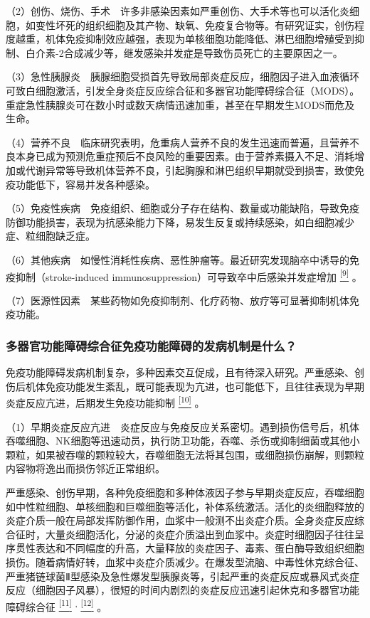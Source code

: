 （2）创伤、烧伤、手术　许多非感染因素如严重创伤、大手术等也可以活化炎细胞，如变性坏死的组织细胞及其产物、缺氧、免疫复合物等。有研究证实，创伤程度越重，机体免疫抑制效应越强，表现为单核细胞功能降低、淋巴细胞增殖受到抑制、白介素-2合成减少等，继发感染并发症是导致伤员死亡的主要原因之一。

（3）急性胰腺炎　胰腺细胞受损首先导致局部炎症反应，细胞因子进入血液循环可致白细胞激活，引发全身炎症反应综合征和多器官功能障碍综合征（MODS）。重症急性胰腺炎可在数小时或数天病情迅速加重，甚至在早期发生MODS而危及生命。

（4）营养不良　临床研究表明，危重病人营养不良的发生迅速而普遍，且营养不良本身已成为预测危重症预后不良风险的重要因素。由于营养素摄入不足、消耗增加或代谢异常等导致机体营养不良，引起胸腺和淋巴组织早期就受到损害，致使免疫功能低下，容易并发各种感染。

（5）免疫性疾病　免疫组织、细胞或分子存在结构、数量或功能缺陷，导致免疫防御功能损害，表现为抗感染能力下降，易发生反复或持续感染，如白细胞减少症、粒细胞缺乏症。

（6）其他疾病　如慢性消耗性疾病、恶性肿瘤等。最近研究发现脑卒中诱导的免疫抑制（stroke-induced
immunosuppression）可导致卒中后感染并发症增加
\protect\hyperlink{text00007.htmlux5cux23ch9-6}{\textsuperscript{{[}9{]}}}
。

（7）医源性因素　某些药物如免疫抑制剂、化疗药物、放疗等可显著抑制机体免疫功能。

\subsubsection{多器官功能障碍综合征免疫功能障碍的发病机制是什么？}

免疫功能障碍发病机制复杂，多种因素交互促成，且有待深入研究。严重感染、创伤后机体免疫功能发生紊乱，既可能表现为亢进，也可能低下，且往往表现为早期炎症反应亢进，后期发生免疫功能抑制
\protect\hyperlink{text00007.htmlux5cux23ch10-6}{\textsuperscript{{[}10{]}}}
。

（1）早期炎症反应亢进　炎症反应与免疫反应关系密切。遇到损伤信号后，机体吞噬细胞、NK细胞等迅速动员，执行防卫功能，吞噬、杀伤或抑制细菌或其他小颗粒，如果被吞噬的颗粒较大，吞噬细胞无法将其包围，或细胞损伤崩解，则颗粒内容物将逸出而损伤邻近正常组织。

严重感染、创伤早期，各种免疫细胞和多种体液因子参与早期炎症反应，吞噬细胞如中性粒细胞、单核细胞和巨噬细胞等活化，补体系统激活。活化的炎细胞释放的炎症介质一般在局部发挥防御作用，血浆中一般测不出炎症介质。全身炎症反应综合征时，大量炎细胞活化，分泌的炎症介质溢出到血浆中。炎症时细胞因子往往呈序贯性表达和不同幅度的升高，大量释放的炎症因子、毒素、蛋白酶导致组织细胞损伤。随着病情好转，血浆中炎症介质减少。在爆发型流脑、中毒性休克综合征、严重猪链球菌Ⅱ型感染及急性爆发型胰腺炎等，引起严重的炎症反应或暴风式炎症反应（细胞因子风暴），很短的时间内剧烈的炎症反应迅速引起休克和多器官功能障碍综合征
\protect\hyperlink{text00007.htmlux5cux23ch11-6}{\textsuperscript{{[}11{]}}}
\textsuperscript{,}
\protect\hyperlink{text00007.htmlux5cux23ch12-6}{\textsuperscript{{[}12{]}}}
。

